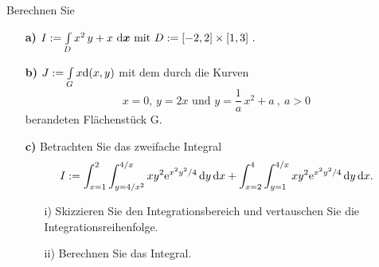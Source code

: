  {
Berechnen Sie 
\begin{itemize}
\item[\textbf{a)}] $	I := \int\limits_D  x^2\,y+x \ \mathrm{d} \boldsymbol x \text{ mit } D := [-2,2]\times[1,3]\ .$
\item[\textbf{b)}] $J:= \int\limits_G x \mathrm{d} (x,y)$ mit dem durch die Kurven \\
$$x=0,\, y=2x \text{ und } y=\frac1a\,x^2+a\ ,\ a>0$$
berandeten Fl\"achenst\"uck G. 
\item[\textbf{c)}] Betrachten Sie das zweifache Integral
$$ I:= \int_{x=1}^2 \int_{y=4/x^2}^{4/x} 
  x y^2 \mathrm{e}^{x^2y^2/4} \, \text{d} y \, \text{d} x + 
  \int_{x=2}^4 \int_{y=1}^{4/x} 
  x y^2 \mathrm{e}^{x^2y^2/4} \, \text{d} y \, \text{d} x . $$
\begin{itemize}
\item[i)] Skizzieren Sie den Integrationsbereich und vertauschen Sie die 
Integrationsreihenfolge.
\item[ii)] Berechnen Sie das Integral.
\end{itemize} 
\end{itemize}
}


